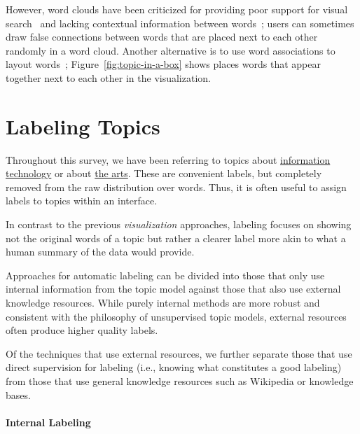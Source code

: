 However, word clouds have been criticized for providing poor support for visual
search~\cite{Viegas2008} and lacking contextual information between
words~\cite{harris11}; users can sometimes draw false connections between words
that are placed next to each other randomly in a word cloud.  Another
alternative is to use word associations to layout
words~\citep{Smith:Chuang:Hu:Boyd-Graber:Findlater-2014};
Figure~\ref{fig:topic-in-a-box} shows places words that appear together next to
each other in the visualization.



\section{Labeling Topics}

Throughout this survey, we have been referring to topics about
\underline{information technology} or about \underline{the arts}.  These are
convenient labels, but completely removed from the raw distribution over words.
Thus, it is often useful to assign labels to topics within an interface.

In contrast to the previous \emph{visualization} approaches, labeling
focuses on showing not the original words of a topic but rather a
clearer label more akin to what a human summary of the data would
provide.

Approaches for automatic labeling can be divided into those that only
use internal information from the topic model against those that also
use external knowledge resources.  While purely internal methods are
more robust and consistent with the philosophy of unsupervised topic
models, external resources often produce higher quality
labels.

Of the techniques that use external resources, we further separate
those that use direct supervision for labeling (i.e., knowing what
constitutes a good labeling) from those that use general knowledge
resources such as Wikipedia or knowledge bases.

\paragraph{Internal Labeling}

